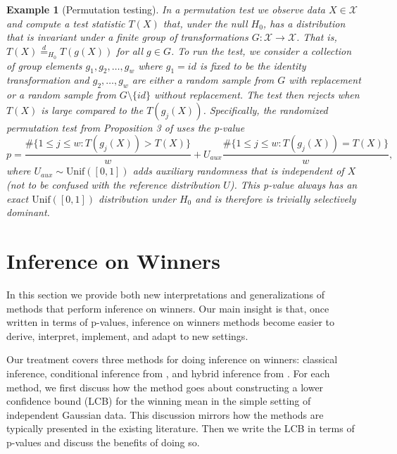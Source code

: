 \documentclass{article}
\newtheorem{example}{Example}
\begin{document}
\begin{example}[Permutation testing]
In a permutation test we observe data $X \in \mathcal{X}$ and compute a test statistic $T(X)$ that, under the null $H_0$, has a distribution that is invariant under a finite group of transformations $G : \mathcal{X} \rightarrow \mathcal{X}$. That is, $T(X) \overset{d}{=}_{H_0} T(g(X))$ for all $ g \in G$. To run the test, we consider a collection of group elements $g_1, g_2, \dots, g_w$ where $g_1 = id$ is fixed to be the identity transformation and $g_2, \dots, g_w$ are either a random sample from $G$ with replacement or a random sample from $G \setminus \{id \}$ without replacement. The test then rejects when $T(X)$ is large compared to the $T(g_j(X))$. Specifically, the randomized permutation test from Proposition 3 of \cite{Hemerik} uses the p-value
\begin{equation*}
    p = \frac{\#\{1 \leq j \leq w : T(g_j(X)) > T(X) \}}{w} + U_{aux} \frac{\#\{1 \leq j \leq w : T(g_j(X)) = T(X) \}}{w},
\end{equation*}
where $U_{aux} \sim \text{Unif}([0, 1])$ adds auxiliary randomness that is independent of $X$ (not to be confused with the reference distribution $U$). This p-value always has an exact $\text{Unif}([0, 1])$ distribution under $H_0$ and is therefore is trivially selectively dominant. 
\end{example}


\section{Inference on Winners}
\label{sec:winner}

In this section we provide both new interpretations and generalizations of methods that perform inference on winners. Our main insight is that, once written in terms of p-values, inference on winners methods become easier to derive, interpret, implement, and adapt to new settings. 

Our treatment covers three methods for doing inference on winners: classical inference, conditional inference from \cite{Fithian}, and hybrid inference from \cite{Andrews2023}. For each method, we first discuss how the method goes about constructing a lower confidence bound (LCB) for the winning mean in the simple setting of independent Gaussian data. This discussion mirrors how the methods are typically presented in the existing literature. Then we write the LCB in terms of p-values and discuss the benefits of doing so. %
\end{document}
